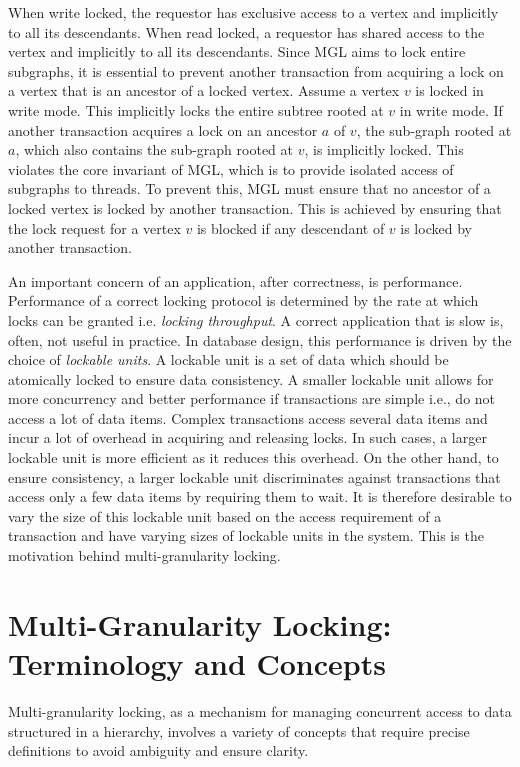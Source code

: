 When write locked, the requestor has exclusive access to a vertex and implicitly to all its descendants. When read locked, a requestor has shared access to the vertex and implicitly to all its descendants. Since MGL aims to lock entire subgraphs, it is essential to prevent another transaction from acquiring a lock on a vertex that is an ancestor of a locked vertex. Assume a vertex $v$ is locked in write mode. This implicitly locks the entire subtree rooted at $v$ in write mode. If another transaction acquires a lock on an ancestor $a$ of $v$, the sub-graph rooted at $a$, which also contains the sub-graph rooted at $v$, is implicitly locked. This violates the core invariant of MGL, which is to provide isolated access of subgraphs to threads. To prevent this, MGL must ensure that no ancestor of a locked vertex is locked by another transaction. This is achieved by ensuring that the lock request for a vertex $v$ is blocked if any descendant of $v$ is locked by another transaction.

An important concern of an application, after correctness, is performance. Performance of a correct locking protocol is determined by the rate at which locks can be granted i.e. \emph{locking throughput}. A correct application that is slow is, often, not useful in practice. In database design, this performance is driven by the choice of \emph{lockable units}. A lockable unit is a set of data which should be atomically locked to ensure data consistency. A smaller lockable unit allows for more concurrency and better performance if transactions are simple i.e., do not access a lot of data items. Complex transactions access several data items and incur a lot of overhead in acquiring and releasing locks. In such cases, a larger lockable unit is more efficient as it reduces this overhead.  On the other hand, to ensure consistency, a larger lockable unit discriminates against transactions that access only a few data items by requiring them to wait. It is therefore desirable to vary the size of this lockable unit based on the access requirement of a transaction and have varying sizes of lockable units in the system. This is the motivation behind multi-granularity locking. 

\section{Multi-Granularity Locking: Terminology and Concepts}

Multi-granularity locking, as a mechanism for managing concurrent access to data structured in a hierarchy, involves a variety of concepts that require precise definitions to avoid ambiguity and ensure clarity.

